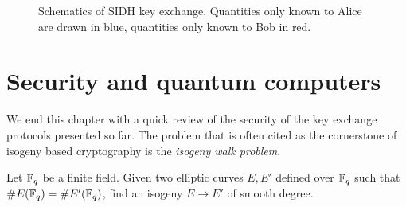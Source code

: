 \documentclass[b5layout]{hdr}
\begin{document}
\begin{figure}
  \centering

  \caption{Schematics of SIDH key exchange. Quantities only known to
    Alice are drawn in blue, quantities only known to Bob in red.}
  \label{fig:sidh}
\end{figure}




\section{Security and quantum computers}

We end this chapter with a quick review of the security of the key
exchange protocols presented so far. %
The problem that is often cited as the cornerstone of isogeny based
cryptography is the \emph{isogeny walk problem}.

\begin{problem}
  \label{prob:iwp}
  Let $\mathbb{F}_q$ be a finite field. %
  Given two elliptic curves $E,E'$ defined over $\mathbb{F}_q$ such that
  $\#E(\mathbb{F}_q)=\#E'(\mathbb{F}_q)$, find an isogeny $E→E'$ of smooth degree.
\end{problem}
\end{document}
